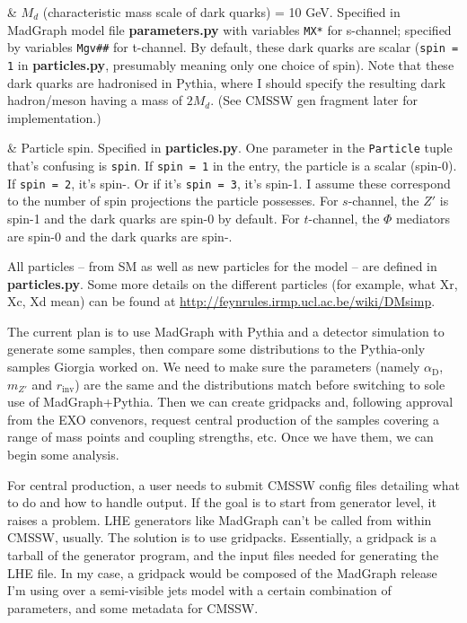 \begin{easylist}[itemize]
& $M_d$ (characteristic mass scale of dark quarks) = 10 GeV. Specified in MadGraph model file \textbf{parameters.py} with variables \texttt{MX*} for s-channel; specified by variables \texttt{Mgv\#\#} for t-channel. By default, these dark quarks are scalar (\texttt{spin = 1} in \textbf{particles.py}, presumably meaning only one choice of spin). Note that these dark quarks are hadronised in Pythia, where I should specify the resulting dark hadron/meson having a mass of $2M_d$. (See CMSSW gen fragment later for implementation.)

& Particle spin. Specified in \textbf{particles.py}. One parameter in the \texttt{Particle} tuple that's confusing is \texttt{spin}. If \texttt{spin = 1} in the entry, the particle is a scalar (spin-0). If \texttt{spin = 2}, it's spin-. Or if it's \texttt{spin = 3}, it's spin-1. I assume these correspond to the number of spin projections the particle possesses. For $s$-channel, the $Z'$ is spin-1 and the dark quarks are spin-0 by default. For $t$-channel, the $\Phi$ mediators are spin-0 and the dark quarks are spin-. 

\end{easylist}

All particles -- from SM as well as new particles for the model -- are defined in \textbf{particles.py}. Some more details on the different particles (for example, what Xr, Xc, Xd mean) can be found at \url{http://feynrules.irmp.ucl.ac.be/wiki/DMsimp}.

The current plan is to use MadGraph with Pythia and a detector simulation to generate some samples, then compare some distributions to the Pythia-only samples Giorgia worked on. We need to make sure the parameters (namely $\alpha_{\mathrm{D}}$, $m_{Z'}$ and $r_{\mathrm{inv}}$) are the same and the distributions match before switching to sole use of MadGraph+Pythia. Then we can create gridpacks and, following approval from the EXO convenors, request central production of the samples covering a range of mass points and coupling strengths, etc. Once we have them, we can begin some analysis.

For central production, a user needs to submit CMSSW config files detailing what to do and how to handle output. If the goal is to start from generator level, it raises a problem. LHE generators like MadGraph can't be called from within CMSSW, usually. The solution is to use gridpacks. Essentially, a gridpack is a tarball of the generator program, and the input files needed for generating the LHE file. In my case, a gridpack would be composed of the MadGraph release I'm using over a semi-visible jets model with a certain combination of parameters, and some metadata for CMSSW.

